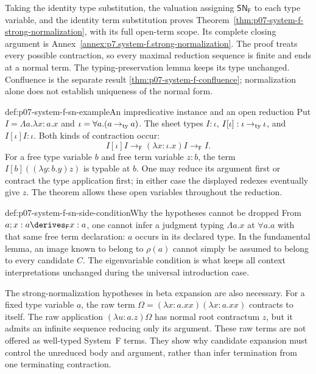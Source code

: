 Taking the identity type substitution, the valuation assigning
\(\mathsf{SN}_{\mathsf F}\) to each type variable, and the identity
term substitution proves
Theorem~\ref{thm:p07-system-f-strong-normalization}, with its full open-term
scope. Its complete closing argument is
Annex~\ref{annex:p7.system-f.strong-normalization}.
The proof treats every possible contraction, so every maximal reduction
sequence is finite and ends at a normal term. The typing-preservation
lemma keeps its type unchanged. Confluence is the separate result
\ref{thm:p07-system-f-confluence}; normalization alone does not establish
uniqueness of the normal form.

\begin{hbexample}{def:p07-system-f-sn-example}{An impredicative instance and an open reduction}
Put \(I=\Lambda a.\lambda x{:}a.x\) and
\(\iota=\forall a.(a\mathbin{\to_{\rm ty}}a)\).
The sheet types \(I:\iota\), \(I[\iota]:\iota\mathbin{\to_{\rm ty}}\iota\),
and \(I[\iota]I:\iota\). Both kinds of contraction occur:
\[
 I[\iota]I\to_{\mathsf F}(\lambda x{:}\iota.x)I
                 \to_{\mathsf F}I.
\]
For a free type variable \(b\) and free term variable \(z:b\),
the term \(I[b]((\lambda y{:}b.y)z)\) is typable at \(b\).
One may reduce its argument first or contract the type application first;
in either case the displayed redexes eventually give \(z\).
The theorem allows these open variables throughout the reduction.
\end{hbexample}

\begin{hbwarning}{def:p07-system-f-sn-side-condition}{Why the hypotheses cannot be dropped}
From \(a;x:a\derives_{\mathsf F}x:a\), one cannot infer a judgment
typing \(\Lambda a.x\) at \(\forall a.a\) with that same free
term declaration: \(a\) occurs in its declared type. In the fundamental
lemma, an image known to belong to \(\rho(a)\) cannot simply be
assumed to belong to every candidate \(C\). The eigenvariable condition
is what keeps all context interpretations unchanged during the universal
introduction case.

The strong-normalization hypotheses in beta expansion are also necessary.
For a fixed type variable \(a\), the raw term
\(\Omega=(\lambda x{:}a.xx)(\lambda x{:}a.xx)\) contracts to itself.
The raw application \((\lambda u{:}a.z)\Omega\) has normal root
contractum \(z\), but it admits an infinite sequence reducing only its
argument. These raw terms are not offered as well-typed System~F terms.
They show why candidate expansion must control the unreduced body and
argument, rather than infer termination from one terminating contraction.
\end{hbwarning}

